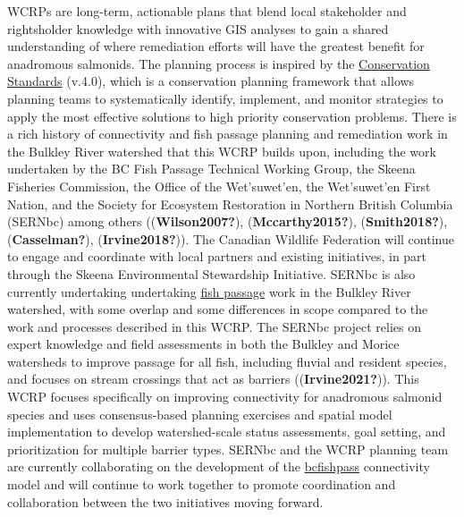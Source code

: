 \documentclass[
  letterpaper,
  DIV=11,
  numbers=noendperiod]{scrreprt}
\begin{document}
WCRPs are long-term, actionable plans that blend local stakeholder and
rightsholder knowledge with innovative GIS analyses to gain a shared
understanding of where remediation efforts will have the greatest
benefit for anadromous salmonids. The planning process is inspired by
the
\href{https://cmp-openstandards.org/wp-content/uploads/2020/07/CMP-Open-Standards-for-the-Practice-of-Conservation-v4.0.pdf}{Conservation
Standards} (v.4.0), which is a conservation planning framework that
allows planning teams to systematically identify, implement, and monitor
strategies to apply the most effective solutions to high priority
conservation problems. There is a rich history of connectivity and fish
passage planning and remediation work in the Bulkley River watershed
that this WCRP builds upon, including the work undertaken by the BC Fish
Passage Technical Working Group, the Skeena Fisheries Commission, the
Office of the Wet'suwet'en, the Wet'suwet'en First Nation, and the
Society for Ecosystem Restoration in Northern British Columbia (SERNbc)
among others ((\textbf{Wilson2007?}), (\textbf{Mccarthy2015?}),
(\textbf{Smith2018?}), (\textbf{Casselman?}), (\textbf{Irvine2018?})).
The Canadian Wildlife Federation will continue to engage and coordinate
with local partners and existing initiatives, in part through the Skeena
Environmental Stewardship Initiative. SERNbc is also currently
undertaking undertaking
\href{https://www.newgraphenvironment.com/fish_passage_bulkley_2020_reporting/Bulkley.pdf}{fish
passage} work in the Bulkley River watershed, with some overlap and some
differences in scope compared to the work and processes described in
this WCRP. The SERNbc project relies on expert knowledge and field
assessments in both the Bulkley and Morice watersheds to improve passage
for all fish, including fluvial and resident species, and focuses on
stream crossings that act as barriers ((\textbf{Irvine2021?})). This
WCRP focuses specifically on improving connectivity for anadromous
salmonid species and uses consensus-based planning exercises and spatial
model implementation to develop watershed-scale status assessments, goal
setting, and prioritization for multiple barrier types. SERNbc and the
WCRP planning team are currently collaborating on the development of the
\href{https://github.com/smnorris/bcfishpass}{bcfishpass} connectivity
model and will continue to work together to promote coordination and
collaboration between the two initiatives moving forward.
\end{document}
